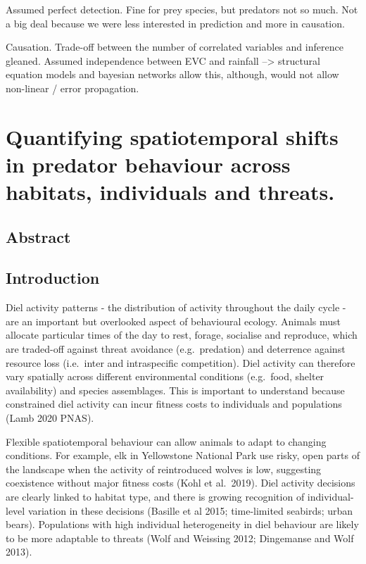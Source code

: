 \documentclass[11pt,a4paper,titlepage,twoside,openright]{style/unimelbthesis}
\begin{document}
\begin{mainmatter}
Assumed perfect detection. Fine for prey species, but predators not so much. Not a big deal because we were less interested in prediction and more in causation.

Causation. Trade-off between the number of correlated variables and inference gleaned. Assumed independence between EVC and rainfall --\textgreater{} structural equation models and bayesian networks allow this, although, would not allow non-linear / error propagation.

\hypertarget{diel}{%
\chapter{Quantifying spatiotemporal shifts in predator behaviour across habitats, individuals and threats.}\label{diel}}

\hypertarget{abstract-1}{%
\section*{Abstract}\label{abstract-1}}

\newpage

\hypertarget{introduction-2}{%
\section{Introduction}\label{introduction-2}}

Diel activity patterns - the distribution of activity throughout the daily cycle - are an important but overlooked aspect of behavioural ecology. Animals must allocate particular times of the day to rest, forage, socialise and reproduce, which are traded-off against threat avoidance (e.g.~predation) and deterrence against resource loss (i.e.~inter and intraspecific competition). Diel activity can therefore vary spatially across different environmental conditions (e.g.~food, shelter availability) and species assemblages. This is important to understand because constrained diel activity can incur fitness costs to individuals and populations (Lamb 2020 PNAS).

Flexible spatiotemporal behaviour can allow animals to adapt to changing conditions. For example, elk in Yellowstone National Park use risky, open parts of the landscape when the activity of reintroduced wolves is low, suggesting coexistence without major fitness costs (Kohl et al.~2019). Diel activity decisions are clearly linked to habitat type, and there is growing recognition of individual-level variation in these decisions (Basille et al 2015; time-limited seabirds; urban bears). Populations with high individual heterogeneity in diel behaviour are likely to be more adaptable to threats (Wolf and Weissing 2012; Dingemanse and Wolf 2013).


\end{mainmatter}
\end{document}
